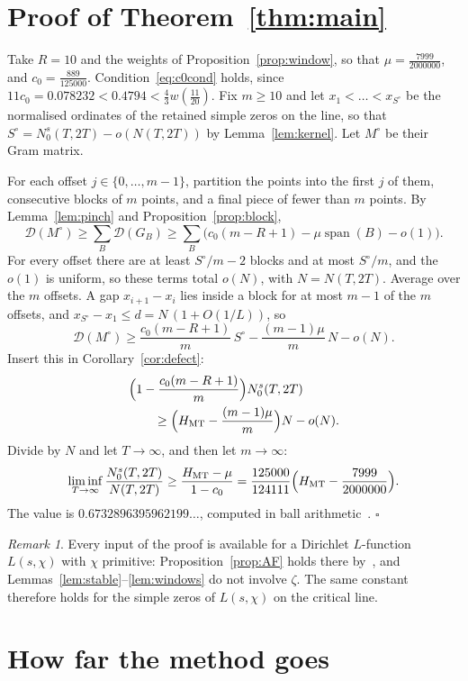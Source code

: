 \documentclass[aps,prd,twocolumn,superscriptaddress,nofootinbib,longbibliography,floatfix,showkeys,amsmath,amssymb,10pt]{revtex4-2}
\theoremstyle{definition}
\theoremstyle{remark}
\newtheorem{remark}[theorem]{Remark}
\newcommand{\cD}{\mathcal{D}}
\newcommand{\MT}{\mathrm{MT}}
\DeclareMathOperator{\spanop}{span}
\begin{document}
\section{Proof of Theorem~\ref{thm:main}}\label{sec:proof}

Take $R=10$ and the weights of Proposition~\ref{prop:window}, so that
$\mu=\frac{7999}{2000000}$, and $c_0=\frac{889}{125000}$. Condition~\eqref{eq:c0cond} holds, since
$11c_0=0.078232<0.4794<\frac43w(\frac{11}{20})$. Fix $m\ge10$ and let
$x_1<\dots<x_{S^\circ}$ be the normalised ordinates of the retained simple
zeros on the line, so that
$S^\circ=N_0^s(T,2T)-o(N(T,2T))$ by Lemma~\ref{lem:kernel}. Let $M^\circ$
be their Gram matrix.

For each offset $j\in\{0,\dots,m-1\}$, partition the points into the first
$j$ of them, consecutive blocks of $m$ points, and a final piece of fewer
than $m$ points. By Lemma~\ref{lem:pinch} and Proposition~\ref{prop:block},
\[
 \cD(M^\circ)\ge\sum_B\cD(G_B)
 \ge\sum_B\bigl(c_0(m-R+1)-\mu\spanop(B)-o(1)\bigr).
\]
For every offset there are at least $S^\circ/m-2$ blocks and at most
$S^\circ/m$, and the $o(1)$ is uniform, so these terms total $o(N)$, with
$N=N(T,2T)$. Average over the $m$ offsets. A gap $x_{i+1}-x_i$ lies inside a
block for at most $m-1$ of the $m$ offsets, and
$x_{S^\circ}-x_1\le d=N\,(1+O(1/L))$, so
\[
 \cD(M^\circ)\ge\frac{c_0(m-R+1)}m\,S^\circ-\frac{(m-1)\mu}m\,N-o(N).
\]
Insert this in Corollary~\ref{cor:defect}:
\begin{align*}
 &\Bigl(1-\frac{c_0(m-R+1)}m\Bigr)N_0^s(T,2T)\\
 &\qquad\ge\Bigl(H_\MT-\frac{(m-1)\mu}m\Bigr)N-o(N).
\end{align*}
Divide by $N$ and let $T\to\infty$, and then let $m\to\infty$:
\[
 \liminf_{T\to\infty}\frac{N_0^s(T,2T)}{N(T,2T)}\ge
 \frac{H_\MT-\mu}{1-c_0}=\frac{125000}{124111}\Bigl(H_\MT-\frac{7999}{2000000}\Bigr).
\]
The value is $0.6732896395962199\ldots$, computed in ball
arithmetic~\cite{Joh17}. \hfill$\square$

\begin{remark}
Every input of the proof is available for a Dirichlet $L$-function
$L(s,\chi)$ with $\chi$ primitive: Proposition~\ref{prop:AF} holds there
by~\cite[Theorem~B]{AF26}, and Lemmas~\ref{lem:stable}--\ref{lem:windows}
do not involve $\zeta$. The same constant therefore holds for the simple
zeros of $L(s,\chi)$ on the critical line.
\end{remark}

\section{How far the method goes}\label{sec:limits}
\end{document}

